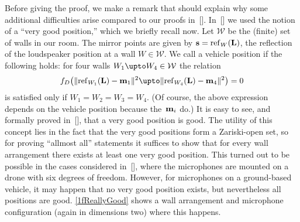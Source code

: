 \documentclass[reqno]{amsart}
\begin{document}
Before giving the proof, we make a remark that should explain why some additional difficulties arise compared to our proofs in~[]. In~[] we used the notion of a
``very good position,'' which we briefly recall now. Let $\mathcal W$
be the (finite) set of walls in our room. The mirror points are given
by $\mathbf{s} = \operatorname{ref}_W(\mathbf{L})$, the reflection of the loudspeaker position
at a wall $W \in \mathcal W$.  We call a vehicle position  if the following holds: for four walls
$W_1 \upto W_4 \in \mathcal W$ the relation
\[
  f_D\bigl(\lVert\re_{W_1}(\ve L) - \ve m_1\rVert^2 \upto
  \lVert\re_{W_4}(\ve L) - \ve m_4\rVert^2\bigr) = 0
\]
is satisfied only if $W_1 = W_2 = W_3 = W_4$. (Of course, the above
expression depends on the vehicle position because the~$\mathbf{m}_i$ do.) It is easy to see, and formally proved
in~[], that a very good position is
good. The utility of this concept lies in the fact that the very good
positions form a Zariski-open set, so for proving ``allmost all''
statements it suffices to show that for every wall arrangement there
exists at least one very good position. This turned out to be possible
in the cases considered in~[], where
the microphones are mounted on a drone with six degrees of
freedom. However, for microphones on a ground-based vehicle, it may
happen that no very good position exists, but nevertheless all
positions are good. \cref{1fReallyGood} shows a wall arrangement and
microphone configuration (again in dimensions two) where this happens.
\end{document}
